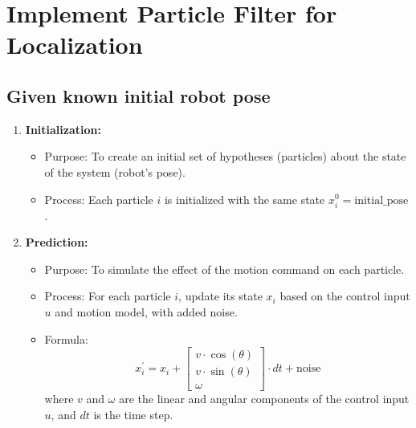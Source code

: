 \documentclass{article}
\begin{document}
\section{Implement Particle Filter for Localization}
\subsection{Given known initial robot pose}

\begin{enumerate}
    \item \textbf{Initialization:} 
    \begin{itemize}
        \item Purpose: To create an initial set of hypotheses (particles) about the state of the system (robot's pose).
        \item Process: Each particle $i$ is initialized with the same state $x_i^0 = \text{initial\_pose}$.
    \end{itemize}
    
    \item \textbf{Prediction:}
    \begin{itemize}
        \item Purpose: To simulate the effect of the motion command on each particle.
        \item Process: For each particle $i$, update its state $x_i$ based on the control input $u$ and motion model, with added noise.
        \item Formula: 
        \[ x_i^{'} = x_i + \begin{bmatrix} v \cdot \cos(\theta) \\ v \cdot \sin(\theta) \\ \omega \end{bmatrix} \cdot dt + \text{noise} \]
        where $v$ and $\omega$ are the linear and angular components of the control input $u$, and $dt$ is the time step.
    \end{itemize}
    

\end{enumerate}
\end{document}
